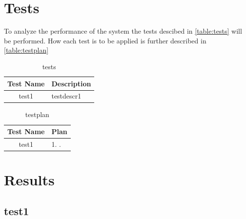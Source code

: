       
\section{Tests}
\label{results:tests}
To analyze the performance of the system the tests descibed in \autoref{table:tests} will be performed. How each test is to be applied is further described in \autoref{table:testplan}

\begin{table}[htb!]
    \centering
    \begin{tabular}{ |c|p{12cm}| }
        \hline
        Test Name & Description \\
        \hline
        \hline
        test1 & testdescr1
        \\
        \hline
    \end{tabular}
    \caption{tests}
    \label{table:tests}
\end{table}
 
\begin{table}[htb!]
    \centering
    \begin{tabular}{ |c|p{12cm}| }
        \hline
        Test Name & Plan\\
        \hline
        \hline
        test1 & 
        1. \newline
        2. \newline
        \\
        \hline
    \end{tabular}
    \caption{testplan}
    \label{table:testplan}
\end{table}      
     
\section{Results}
\label{results:results}

\subsection{test1}
\label{results:test1}